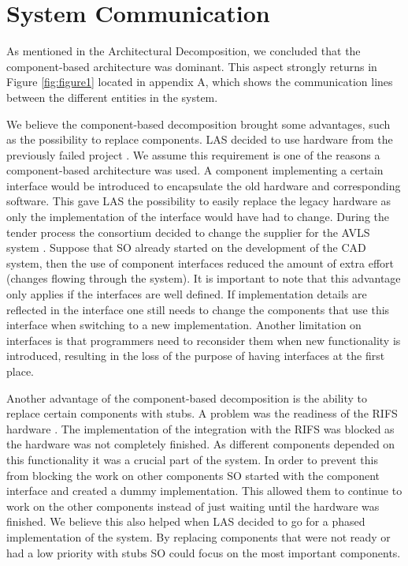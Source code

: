 \section*{System Communication}

As mentioned in the Architectural Decomposition, we concluded that the component-based architecture was dominant.
This aspect strongly returns in Figure \ref{fig:figure1} located in appendix A,
which shows the communication lines between the different entities in the system.

We believe the component-based decomposition brought some advantages, such as the possibility to replace components.
LAS decided to use hardware from the previously failed project \autocite[8]{kramer1996succeedings}.
We assume this requirement is one of the reasons a component-based architecture was used.
A component implementing a certain interface would be introduced to encapsulate the old hardware and corresponding software.
This gave LAS the possibility to easily replace the legacy hardware as only the implementation of the interface would have had to change.
During the tender process the consortium decided to change the supplier for the AVLS system \autocite[3073]{officialreport}.
Suppose that SO already started on the development of the CAD system, then the use of component interfaces reduced the amount of extra effort (changes flowing through the system).
It is important to note that this advantage only applies if the interfaces are well defined.
If implementation details are reflected in the interface one still needs to change the components that use this interface when switching to a new implementation.
Another limitation on interfaces is that programmers need to reconsider them when new functionality is introduced,
resulting in the loss of the purpose of having interfaces at the first place.

Another advantage of the component-based decomposition is the ability to replace certain components with stubs.
A problem was the readiness of the RIFS hardware \autocite[3074]{officialreport}.
The implementation of the integration with the RIFS was blocked as the hardware was not completely finished.
As different components depended on this functionality it was a crucial part of the system.
In order to prevent this from blocking the work on other components SO started with the component interface and created a dummy implementation.
This allowed them to continue to work on the other components instead of just waiting until the hardware was finished.
We believe this also helped when LAS decided to go for a phased implementation of the system.
By replacing components that were not ready or had a low priority with stubs SO could focus on the most important components.

